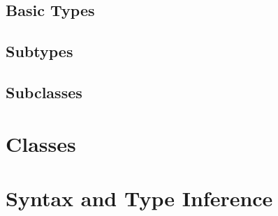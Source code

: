 \section{Basic Types}
\section{Subtypes}
\section{Subclasses}

\chapter{Classes}

\chapter{Syntax and Type Inference}
